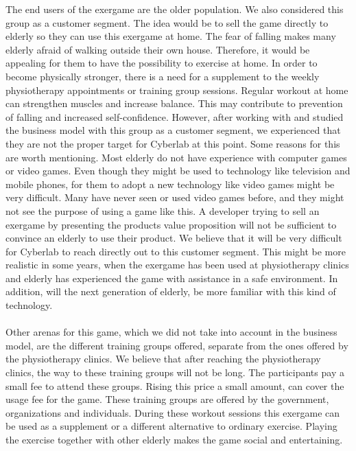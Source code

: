 The end users of the exergame are the older population. We also considered this group as a customer segment. The idea would be to sell the game directly to elderly so they can use this exergame at home. The fear of falling makes many elderly afraid of walking outside their own house. Therefore, it would be appealing for them to have the possibility to exercise at home. In order to become physically stronger, there is a need for a supplement to the weekly physiotherapy appointments or training group sessions. Regular workout at home can strengthen muscles and increase balance.  This may contribute to prevention of falling and increased self-confidence. However, after working with and studied the business model with this group as a customer segment, we experienced that they are not the proper target for Cyberlab at this point. Some reasons for this are worth mentioning. Most elderly do not have experience with computer games or video games. Even though they might be used to technology like television and mobile phones, for them to adopt a new technology like video games might be very difficult. Many have never seen or used video games before, and they might not see the purpose of using a game like this. A developer trying to sell an exergame by presenting the products value proposition will not be sufficient to convince an elderly to use their product. We believe that it will be very difficult for Cyberlab to reach directly out to this customer segment. This might be more realistic in some years, when the exergame has been used at physiotherapy clinics and elderly has experienced the game with assistance in a safe environment. In addition, will the next generation of elderly, be more familiar with this kind of technology.  \\ \\
Other arenas for this game, which we did not take into account in the business model, are the different training groups offered, separate from the ones offered by the physiotherapy clinics. We believe that after reaching the physiotherapy clinics, the way to these training groups will not be long. The participants pay a small fee to attend these groups. Rising this price a small amount, can cover the usage fee for the game. These training groups are offered by the government, organizations and individuals. During these workout sessions this exergame can be used as a supplement or a different alternative to ordinary exercise. Playing the exercise together with other elderly makes the game social and entertaining. \\ \\
